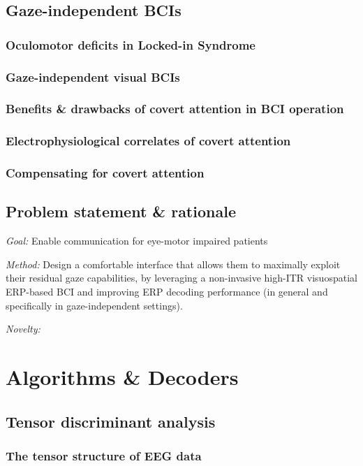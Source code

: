 \chapter{Gaze-independent BCIs}
\section{Oculomotor deficits in Locked-in Syndrome}
\section{Gaze-independent visual BCIs}
\section{Benefits \& drawbacks of covert attention in BCI operation}
\section{Electrophysiological correlates of covert attention}
\section{Compensating for covert attention}

\chapter{Problem statement \& rationale}
\emph{Goal:} Enable communication for eye-motor impaired patients

\emph{Method:} Design a comfortable interface that allows them to maximally exploit
their residual gaze capabilities, by leveraging a non-invasive high-ITR
visuospatial ERP-based BCI and improving ERP decoding performance (in general
and specifically in gaze-independent settings).

\emph{Novelty:}


\part{Algorithms \& Decoders}


\chapter{Tensor discriminant analysis}
\section{The tensor structure of EEG data}
